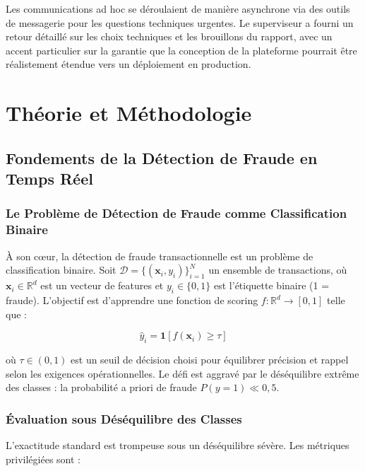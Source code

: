 \documentclass[12pt,a4paper,oneside]{book}
\theoremstyle{definition}
\theoremstyle{plain}
\begin{document}
Les communications ad hoc se déroulaient de manière asynchrone via des outils de messagerie pour les questions techniques urgentes. Le superviseur a fourni un retour détaillé sur les choix techniques et les brouillons du rapport, avec un accent particulier sur la garantie que la conception de la plateforme pourrait être réalistement étendue vers un déploiement en production.

\chapter{Théorie et Méthodologie}
\label{chap:theory}

\section{Fondements de la Détection de Fraude en Temps Réel}

\subsection{Le Problème de Détection de Fraude comme Classification Binaire}

À son cœur, la détection de fraude transactionnelle est un problème de classification binaire. Soit $\mathcal{D} = \{(\mathbf{x}_i, y_i)\}_{i=1}^{N}$ un ensemble de transactions, où $\mathbf{x}_i \in \mathbb{R}^d$ est un vecteur de features et $y_i \in \{0, 1\}$ est l'étiquette binaire (1 = fraude). L'objectif est d'apprendre une fonction de scoring $f: \mathbb{R}^d \rightarrow [0,1]$ telle que :

\begin{equation}
  \hat{y}_i = \mathbf{1}\left[f(\mathbf{x}_i) \geq \tau\right]
  \label{eq:decision}
\end{equation}

où $\tau \in (0,1)$ est un seuil de décision choisi pour équilibrer précision et rappel selon les exigences opérationnelles. Le défi est aggravé par le déséquilibre extrême des classes : la probabilité a priori de fraude $P(y=1) \ll 0,5$.

\subsection{Évaluation sous Déséquilibre des Classes}

L'exactitude standard est trompeuse sous un déséquilibre sévère. Les métriques privilégiées sont :
\end{document}

